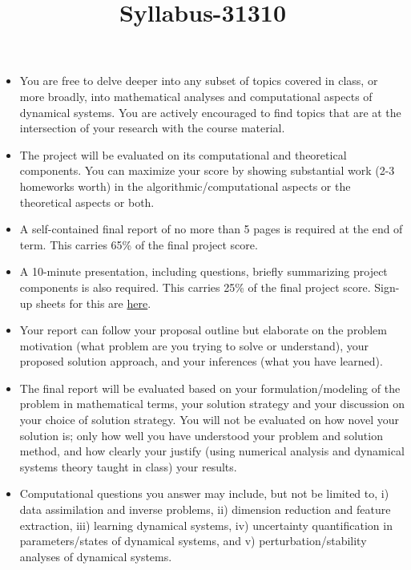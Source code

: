 \documentclass[12pt]{article}
\title{Syllabus-31310}
\begin{document}
\MakeScribeTop

\begin{itemize}
	\item You are free to delve deeper into any subset of topics covered in class, or more
	broadly, into mathematical analyses and computational aspects of dynamical systems. You are actively encouraged
	 to find topics that are at the intersection of your research with the course
	material.
	\item The project will be evaluated on its computational and theoretical components. You
	can maximize your score by showing substantial work (2-3 homeworks worth) in
	the algorithmic/computational aspects or the theoretical aspects or both.
	\item A self-contained final report of no more than 5 pages is required at the end of term.
	This carries 65\% of the final project score.
	\item A 10-minute presentation, including questions, briefly summarizing project components is also required.
	This carries 25\% of the final project score. Sign-up sheets for this are \href{https://docs.google.com/document/d/1DLgG3xIfzimgwl_O6E8mrKifF1pC9hNf6Y7dAF18Cqc/edit?usp=sharing}{here}.
	\item Your report can follow your proposal outline but elaborate on the problem
	motivation (what problem are you trying to solve or understand), your proposed
	solution approach, and your inferences (what you have learned).
	\item  The final report will be evaluated based on your formulation/modeling of the problem in mathematical terms, your solution strategy and your discussion on your
	choice of solution strategy. You will not be evaluated on how novel your solution is; only how well you have understood your problem and solution method,
	and how clearly your justify (using numerical analysis and dynamical systems theory taught in class)
	your results.
	\item Computational questions you answer may include, but not be limited to, 
	i) data assimilation and inverse problems, ii) dimension reduction and feature extraction, iii) learning dynamical systems, iv) uncertainty quantification in parameters/states of dynamical systems, 
	and v) perturbation/stability analyses of dynamical systems.
\end{itemize}

\end{document}
